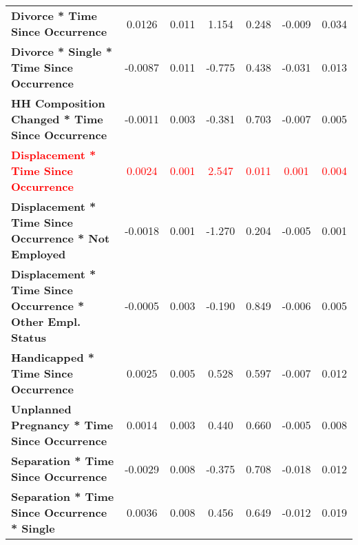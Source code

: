 \begin{center}
\begin{tabular}{lcccccc}
 \textbf{Divorce * Time Since Occurrence}                                                        &       0.0126  &        0.011     &     1.154  &         0.248        &       -0.009    &        0.034     \\
 \textbf{Divorce * Single * Time Since Occurrence}                           &      -0.0087  &        0.011     &    -0.775  &         0.438        &       -0.031    &        0.013     \\
 \textbf{HH Composition Changed * Time Since Occurrence}                                        &      -0.0011  &        0.003     &    -0.381  &         0.703        &       -0.007    &        0.005     \\
 \textcolor{red}{\textbf{Displacement * Time Since Occurrence}}                                        &       \textcolor{red}{0.0024}  &        \textcolor{red}{0.001}     &     \textcolor{red}{2.547}  &         \textcolor{red}{0.011}        &        \textcolor{red}{0.001}    &        \textcolor{red}{0.004}     \\
 \textbf{Displacement * Time Since Occurrence * Not Employed}  &      -0.0018  &        0.001     &    -1.270  &         0.204        &       -0.005    &        0.001     \\
 \textbf{Displacement * Time Since Occurrence * Other Empl. Status}         &      -0.0005  &        0.003     &    -0.190  &         0.849        &       -0.006    &        0.005     \\
 \textbf{Handicapped * Time Since Occurrence}                    &       0.0025  &        0.005     &     0.528  &         0.597        &       -0.007    &        0.012     \\
 \textbf{Unplanned Pregnancy * Time Since Occurrence}                                &       0.0014  &        0.003     &     0.440  &         0.660        &       -0.005    &        0.008     \\
 \textbf{Separation * Time Since Occurrence}                                                      &      -0.0029  &        0.008     &    -0.375  &         0.708        &       -0.018    &        0.012     \\
 \textbf{Separation * Time Since Occurrence * Single}                         &       0.0036  &        0.008     &     0.456  &         0.649        &       -0.012    &        0.019     \\
 \end{tabular}
 \end{center}
